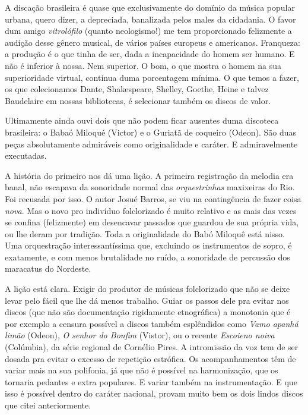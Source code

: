 A discação brasileira é quase que exclusivamente do domínio da música
popular urbana, quero dizer, a depreciada, banalizada pelos males da
cidadania. O favor dum amigo \textit{vitrolófilo} (quanto neologismo!) me tem
proporcionado felizmente a audição desse gênero musical, de vários
países europeus e americanos. Franqueza: a produção é o que tinha de
ser, dada a incapacidade do homem ser humano. E não é inferior à nossa.
Nem superior. O bom, o que mostra o homem na sua superioridade virtual,
continua duma porcentagem mínima. O que temos a fazer, os que
colecionamos Dante, Shakespeare, Shelley, Goethe, Heine e talvez
Baudelaire em nossas bibliotecas, é selecionar também os discos de
valor.

Ultimamente ainda ouvi dois que não podem ficar ausentes duma discoteca
brasileira: o Babaó Miloqué (Victor) e o Guriatã de coqueiro (Odeon).
São duas peças absolutamente admiráveis como originalidade e caráter. E
admiravelmente executadas.

A história do primeiro nos dá uma lição. A primeira registração da
melodia era banal, não escapava da sonoridade normal das \textit{orquestrinhas}
maxixeiras do Rio. Foi recusada por isso. O autor Josué Barros, se viu
na contingência de fazer coisa \textit{nova}. Mas o novo pro indivíduo
folclorizado é muito relativo e as mais das vezes se confina
(felizmente) em desencavar passados que guardou de sua própria vida, ou
lhe deram por tradição. Toda a originalidade do Babó Miloquê está nisso.
Uma orquestração interessantíssima que, excluindo os instrumentos de
sopro, é exatamente, e com menos brutalidade no ruído, a sonoridade de
percussão dos maracatus do Nordeste.

A lição está clara. Exigir do produtor de músicas folclorizado que não
se deixe levar pelo fácil que lhe dá menos trabalho. Guiar os passos
dele pra evitar nos discos (que não são documentação rigidamente
etnográfica) a monotonia que é por exemplo a censura possível a discos
também esplêndidos como \textit{Vamo apanhá limão} (Odeon), \textit{O senhor
do Bonfim} (Vistor), ou o recente \textit{Escoieno noiva} (Colúmbia), da
série regional de Cornélio Pires. A intromissão da voz tem de ser dosada
pra evitar o excesso de repetição estrófica. Os acompanhamentos têm de
variar mais na sua polifonia, já que não é possível na harmonização, que
os tornaria pedantes e extra populares. E variar também na
instrumentação. E que isso é possível dentro do caráter nacional, provam
muito bem os dois lindos discos que citei anteriormente.


